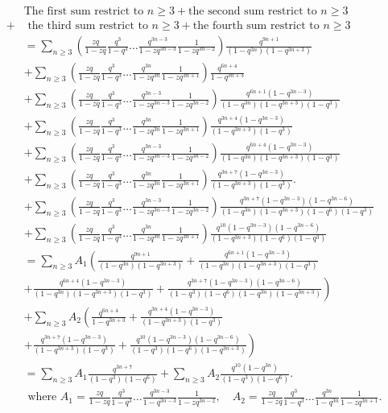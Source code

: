 \documentclass[draft]{amsart}
\numberwithin{equation}{section}
\theoremstyle{plain}
\theoremstyle{remark}
\begin{document}
\begin{align*}
&\mbox{The first sum restrict to } n\geq 3 + \mbox{the second sum restrict to }n\geq 3\\
  +&\mbox{ the third sum restrict to } n\geq3+\mbox{the fourth sum restrict to }n\geq 3\\
&=\sum_{n\geq 3}\left(\frac{zq}{1-zq}\frac{q^{3}}{1-q^{3}}\dots\frac{q^{3n-3}}{1-zq^{3n-3}}\frac{1}{1-zq^{3n-2}}\right)\frac{q^{9n+1}}{(1-q^{3n})(1-q^{3n+3})}     \\
&+\sum_{n\geq 3}\left(\frac{zq}{1-zq}\frac{q^{3}}{1-q^{3}}\dots\frac{q^{3n}}{1-zq^{3n}}\frac{1}{1-zq^{3n+1}}\right)\frac{q^{6n+4}}{1-q^{3n+3}}\\
&+\sum_{n\geq 3}\left(\frac{zq}{1-zq}\frac{q^{3}}{1-q^{3}}\dots\frac{q^{3n-3}}{1-zq^{3n-3}}\frac{1}{1-zq^{3n-2}}\right)\frac{q^{6n+1}(1-q^{3n-3})}{(1-q^{3n})(1-q^{3n+3})(1-q^{3})}  \\
&+\sum_{n\geq 3}\left(\frac{zq}{1-zq}\frac{q^{3}}{1-q^{3}}\dots\frac{q^{3n}}{1-zq^{3n}}\frac{1}{1-zq^{3n+1}}\right)\frac{q^{3n+4}(1-q^{3n-3})}{(1-q^{3n+3})(1-q^{3})}  \\
&+\sum_{n\geq 3}\left(\frac{zq}{1-zq}\frac{q^{3}}{1-q^{3}}\dots\frac{q^{3n-3}}{1-zq^{3n-3}}\frac{1}{1-zq^{3n-2}}\right)\frac{q^{6n+4}(1-q^{3n-3})}{(1-q^{3n})(1-q^{3n+3})(1-q^{3})}  \\
&+\sum_{n\geq 3}\left(\frac{zq}{1-zq}\frac{q^{3}}{1-q^{3}}\dots\frac{q^{3n}}{1-zq^{3n}}\frac{1}{1-zq^{3n+1}}\right)\frac{q^{3n+7}(1-q^{3n-3})}{(1-q^{3n+3})(1-q^{3})}.\\
&+\sum_{n\geq 3}\left(\frac{zq}{1-zq}\frac{q^{3}}{1-q^{3}}\dots\frac{q^{3n-3}}{1-zq^{3n-3}}\frac{1}{1-zq^{3n-2}}\right)\frac{q^{3n+7}(1-q^{3n-3})(1-q^{3n-6})}{(1-q^{3n})(1-q^{3n+3})(1-q^{6})(1-q^{3})} \\
&+\sum_{n\geq 3}\left(\frac{zq}{1-zq}\frac{q^{3}}{1-q^{3}}\dots\frac{q^{3n}}{1-zq^{3n}}\frac{1}{1-zq^{3n+1}}\right)\frac{q^{10}(1-q^{3n-3})(1-q^{3n-6})}{(1-q^{3n+3})(1-q^{6})(1-q^{3})}\\
&=\sum_{n\geq 3}A_{1}\left(\frac{q^{9n+1}}{(1-q^{3n})(1-q^{3n+3})}\right.+\frac{q^{6n+1}(1-q^{3n-3})}{(1-q^{3n})(1-q^{3n+3})(1-q^{3})}\\
&+\frac{q^{6n+4}(1-q^{3n-3})}{(1-q^{3n})(1-q^{3n+3})(1-q^{3})}+\left.\frac{q^{3n+7}(1-q^{3n-3})(1-q^{3n-6})}{(1-q^{3})(1-q^{6})(1-q^{3n})(1-q^{3n+3})}\right) \\
&+\sum_{n\geq 3}A_{2}\left(\frac{q^{6n+4}}{1-q^{3n+3}}\right.+\frac{q^{3n+4}(1-q^{3n-3})}{(1-q^{3n+3})(1-q^{3})}\\
&+\frac{q^{3n+7}(1-q^{3n-3})}{(1-q^{3n+3})(1-q^{3})}+\left.\frac{q^{10}(1-q^{3n-3})(1-q^{3n-6})}{(1-q^{3})(1-q^{6})(1-q^{3n+3})}\right) \\
&=\sum_{n\geq 3}A_{1}\frac{q^{3n+7}}{(1-q^{3})(1-q^{6})}+\sum_{n\geq 3}A_{2}\frac{q^{10}(1-q^{3n})}{(1-q^{3})(1-q^{6})}.\\
&\mbox{ where }A_{1}=\frac{zq}{1-zq}\frac{q^{3}}{1-q^{3}} \dots\frac{q^{3n-3}}{1-q^{3n-3}}\frac{1}{1-zq^{3n-2}},\quad
A_{2}=\frac{zq}{1-zq}\frac{q^{3}}{1-q^{3}}\dots\frac{q^{3n}}{1-q^{3n}}\frac{1}{1-zq^{3n+1}}.
 \end{align*}
\end{document}
